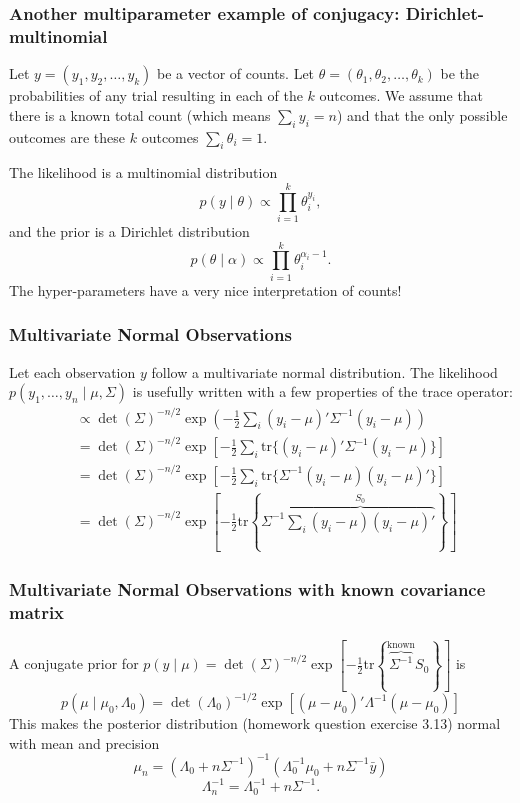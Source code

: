 \documentclass{beamer}
\begin{document}
\begin{frame}[fragile]
\frametitle{Another multiparameter example of conjugacy: Dirichlet-multinomial}

Let $y = (y_1, y_2, \ldots, y_k)$ be a vector of counts. Let $\theta = (\theta_1, \theta_2, \ldots, \theta_k)$ be the probabilities of any trial resulting in each of the $k$ outcomes. We assume that there is a known total count (which means $\sum_i y_i = n$) and that the only possible outcomes are these $k$ outcomes $\sum_i \theta_i = 1$.
\newline

The likelihood is a multinomial distribution
$$
p(y \mid \theta) \propto \prod_{i=1}^k \theta_i^{y_i},
$$
and the prior is a Dirichlet distribution
$$
p(\theta \mid \alpha) \propto \prod_{i=1}^k \theta_i^{\alpha_i - 1}.
$$
The hyper-parameters have a very nice interpretation of counts!
\end{frame}

\begin{frame}[fragile]
\frametitle{Multivariate Normal Observations}

Let each observation $y$ follow a multivariate normal distribution. The likelihood $p(y_1, \ldots, y_n \mid \mu, \Sigma)$ is usefully written with a few properties of the trace operator:
\begin{align*}
&\propto \det(\Sigma)^{-n/2} \exp\left(-\frac{1}{2}\sum_i (y_i - \mu)'\Sigma^{-1}(y_i- \mu) \right) \\
&= \det(\Sigma)^{-n/2} \exp\left[-\frac{1}{2}\sum_i \text{tr}\{ (y_i - \mu)'\Sigma^{-1}(y_i- \mu) \} \right] \\
&= \det(\Sigma)^{-n/2} \exp\left[-\frac{1}{2}\sum_i \text{tr}\{ \Sigma^{-1}(y_i- \mu)(y_i - \mu)' \} \right] \\
&= \det(\Sigma)^{-n/2} \exp\left[-\frac{1}{2} \text{tr}\left\{\Sigma^{-1} \overbrace{\sum_i  (y_i- \mu)(y_i - \mu)'}^{S_0} \right\} \right]
\end{align*}

\end{frame}

\begin{frame}[fragile]
\frametitle{Multivariate Normal Observations with known covariance matrix}

A conjugate prior for $p(y \mid \mu) = \det(\Sigma)^{-n/2} \exp\left[-\frac{1}{2} \text{tr}\left\{\overbrace{\Sigma^{-1}}^{ \text{known} } S_0 \right\} \right]$ is
$$
p(\mu \mid \mu_0, \Lambda_0) = \det(\Lambda_0)^{-1/2} \exp\left[(\mu - \mu_0)'\Lambda^{-1}(\mu - \mu_0) \right]
$$
This makes the posterior distribution (homework question exercise 3.13) normal with mean and precision
\[
\mu_n  = (\Lambda_0 + n \Sigma^{-1})^{-1}(\Lambda_0^{-1} \mu_0 + n \Sigma^{-1} \bar{y})
\]
\[
\Lambda_n^{-1} = \Lambda_0^{-1} + n \Sigma^{-1}.
\]
\end{frame}
\end{document}
